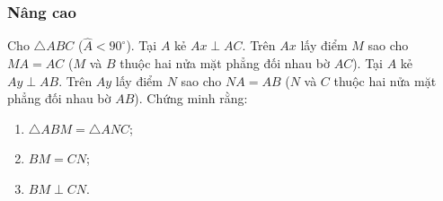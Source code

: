 \subsubsection{Nâng cao}
\begin{bt} %
	Cho $\triangle ABC$ ($\widehat{A} < 90^\circ$). Tại $A$ kẻ $Ax \perp AC$. Trên $Ax$ lấy điểm $M$ sao cho $MA = AC$ ($M$ và $B$ thuộc hai nửa mặt phẳng đối nhau bờ $AC$). Tại $A$ kẻ $Ay \perp AB$. Trên $Ay$ lấy điểm $N$ sao cho $NA = AB$ ($N$ và $C$ thuộc hai nửa mặt phẳng đối nhau bờ $AB$). Chứng minh rằng:
	\begin{enumerate}
		\item $\triangle ABM = \triangle ANC$;
		\item $BM = CN$;
		\item $BM \perp CN$.
	\end{enumerate}  
	
\end{bt}
